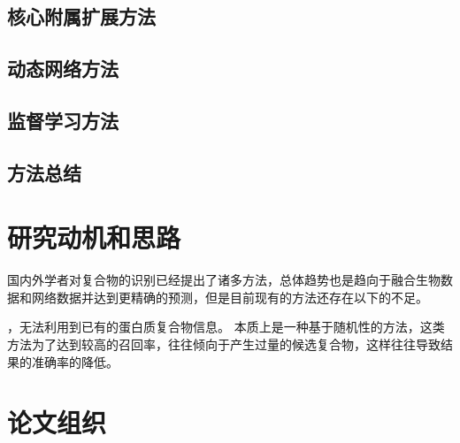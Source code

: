 \subsection{核心附属扩展方法}
\label{section:CoreAppend}
\subsection{动态网络方法}
\label{section:Dynamic}
\subsection{监督学习方法}
\label{section:Supervision}
\subsection{方法总结}
\label{section:researchSummary}

\section{研究动机和思路}
\label{section:motivation}

国内外学者对复合物的识别已经提出了诸多方法，总体趋势也是趋向于融合生物数据和网络数据并达到更精确的预测，但是目前现有的方法还存在以下的不足。
\begin{itemize}
  ，无法利用到已有的蛋白质复合物信息。
  本质上是一种基于随机性的方法，这类方法为了达到较高的召回率，往往倾向于产生过量的候选复合物，这样往往导致结果的准确率的降低。
\end{itemize}

\section{论文组织}
\label{section:organization}
